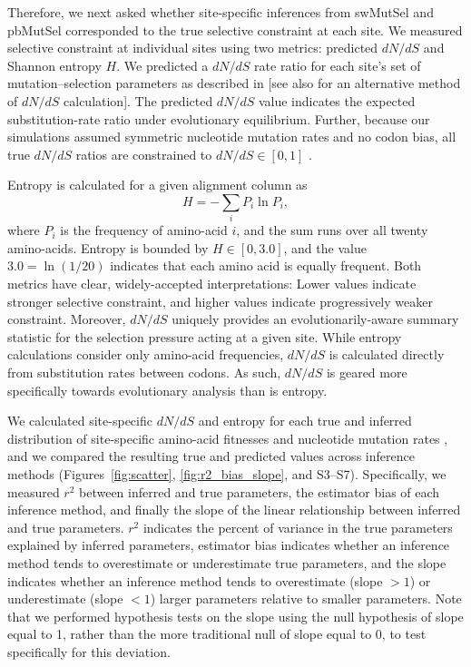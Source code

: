\documentclass[11pt]{article}
\begin{document}
Therefore, we next asked whether site-specific inferences from swMutSel and pbMutSel corresponded to the true selective constraint at each site. We measured selective constraint at individual sites using two metrics: predicted $dN/dS$ and Shannon entropy $H$. We predicted a $dN/dS$ rate ratio for each site's set of mutation--selection parameters as described in \citet{SpielmanWilke2015,pyvolve} [see also \citet{dosReis2015} for an alternative method of $dN/dS$ calculation]. The predicted $dN/dS$ value indicates the expected substitution-rate ratio under evolutionary equilibrium. Further, because our simulations assumed symmetric nucleotide mutation rates and no codon bias, all true $dN/dS$ ratios are constrained to $dN/dS\in[0,1]$ \citep{SpielmanWilke2015}.

Entropy is calculated for a given alignment column as
\begin{equation}
        H = - \sum_iP_{i}\ln P_{i},
\end{equation}
where $P_i$ is the frequency of amino-acid $i$, and the sum runs over all twenty amino-acids. Entropy is bounded by $H\in[0,3.0]$, and the value $3.0=\ln(1/20)$ indicates that each amino acid is equally frequent. Both metrics have clear, widely-accepted interpretations: Lower values indicate stronger selective constraint, and higher values indicate progressively weaker constraint. Moreover, $dN/dS$ uniquely provides an evolutionarily-aware summary statistic for the selection pressure acting at a given site. While entropy calculations consider only amino-acid frequencies, $dN/dS$ is calculated directly from substitution rates between codons. As such, $dN/dS$ is geared more specifically towards evolutionary analysis than is entropy.


We calculated site-specific $dN/dS$ and entropy for each true and inferred distribution of site-specific amino-acid fitnesses and nucleotide mutation rates \citep{SpielmanWilke2015}, and we compared the resulting true and predicted values across inference methods (Figures~\ref{fig:scatter}, \ref{fig:r2_bias_slope}, and S3--S7). Specifically, we measured $r^2$ between inferred and true parameters, the estimator bias of each inference method, and finally the slope of the linear relationship between inferred and true parameters. $r^2$ indicates the percent of variance in the true parameters explained by inferred parameters, estimator bias indicates whether an inference method tends to overestimate or underestimate true parameters, and the slope indicates whether an inference method tends to overestimate (slope $>1$) or underestimate (slope $<1$) larger parameters relative to smaller parameters. Note that we performed hypothesis tests on the slope using the null hypothesis of slope equal to 1, rather than the more traditional null of slope equal to 0, to test specifically for this deviation.
\end{document}
